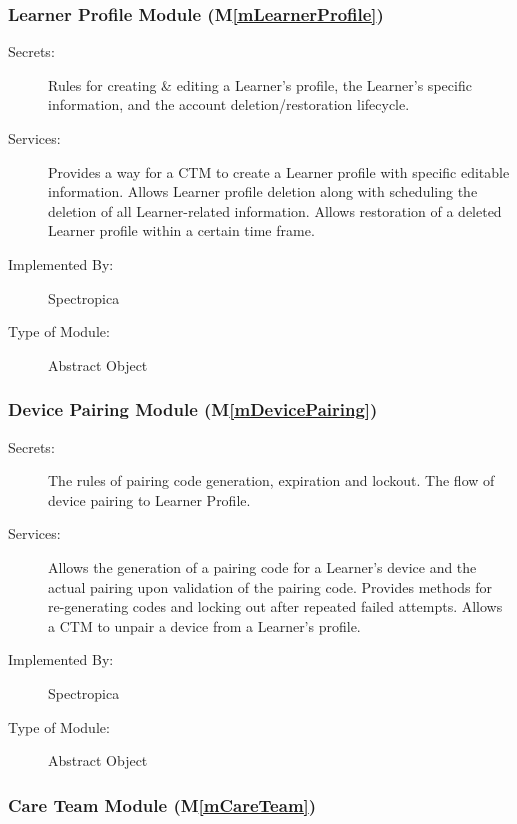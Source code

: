 \documentclass[12pt, titlepage]{article}
\newcommand{\mref}[1]{M\ref{#1}}
\begin{document}
\subsubsection{Learner Profile Module (\mref{mLearnerProfile})}

\begin{description}
\item[Secrets:] Rules for creating \& editing a Learner's profile, the Learner's specific information, and the account deletion/restoration lifecycle. 
\item[Services:] Provides a way for a CTM to create a Learner profile with specific editable information. Allows Learner profile deletion along with scheduling the deletion of all Learner-related information. Allows restoration of a deleted Learner profile within a certain time frame.
\item[Implemented By:] Spectropica
\item[Type of Module:] Abstract Object
\end{description}

\subsubsection{Device Pairing Module (\mref{mDevicePairing})}

\begin{description}
\item[Secrets:] The rules of pairing code generation, expiration and lockout. The flow of device pairing to Learner Profile.
\item[Services:] Allows the generation of a pairing code for a Learner's device and the actual pairing upon validation of the pairing code. Provides methods for re-generating codes and locking out after repeated failed attempts. Allows a CTM to unpair a device from a Learner's profile. 
\item[Implemented By:] Spectropica
\item[Type of Module:] Abstract Object
\end{description}

\subsubsection{Care Team Module (\mref{mCareTeam})}
\end{document}
